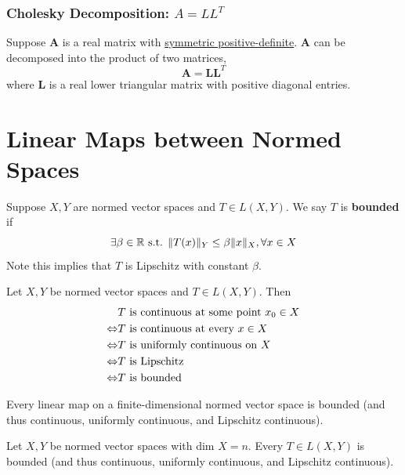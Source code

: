 \documentclass[11pt]{elegantbook}
\begin{document}
\subsection{Cholesky Decomposition: $A=LL^T$}
\begin{proposition}
    Suppose $\boldsymbol{A}$ is a real matrix with \underline{symmetric positive-definite}. $\boldsymbol{A}$ can be decomposed into the product of two matrices, $$\boldsymbol{A}=\boldsymbol{L}\boldsymbol{L}^T$$where $\boldsymbol{L}$ is a real lower triangular matrix with positive diagonal entries.
\end{proposition}

\chapter{Linear Maps between Normed Spaces}
\begin{definition}
    \normalfont
    Suppose $X, Y$ are normed vector spaces and $T \in L(X, Y)$. We say $T$ is \textbf{bounded} if $$\exists \beta\in \mathbb{R} \textnormal{ s.t. }\|T(x)\|_Y\leq\beta\|x\|_X, \forall x\in X$$
    Note this implies that $T$ is Lipschitz with constant $\beta$.
\end{definition}

\begin{theorem}
    Let $X, Y$ be normed vector spaces and $T \in L(X, Y)$. Then
    \begin{equation}
        \begin{aligned}
            &\textnormal{$T$ is continuous at some point $x_0 \in X$}\\
            \Leftrightarrow&\textnormal{$T$ is continuous at every $x \in X$}\\
            \Leftrightarrow&\textnormal{$T$ is uniformly continuous on $X$}\\
            \Leftrightarrow&\textnormal{$T$ is Lipschitz}\\
            \Leftrightarrow&\textnormal{$T$ is bounded}
        \end{aligned}
        \nonumber
    \end{equation}
\end{theorem}

\begin{note}
    Every linear map on a finite-dimensional normed vector space is bounded (and thus continuous, uniformly continuous, and Lipschitz continuous).
\end{note}
\begin{theorem}
    Let $X, Y$ be normed vector spaces with dim $X = n$. Every $T \in L(X, Y)$ is bounded (and thus continuous, uniformly continuous, and Lipschitz continuous).
\end{theorem}
\end{document}
